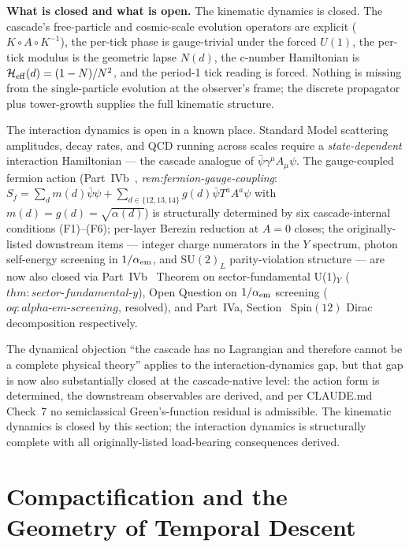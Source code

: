 \documentclass[12pt,a4paper]{article}
\begin{document}
\medskip\noindent\textbf{What is closed and what is open.}
The kinematic dynamics is closed. The cascade's free-particle and
cosmic-scale evolution operators are explicit
($K \circ A \circ K^{-1}$), the per-tick phase is gauge-trivial under
the forced $U(1)$, the per-tick modulus is the geometric lapse
$N(d)$, the c-number Hamiltonian is $\mathcal{H}_{\rm eff}(d) = (1-N)/N^2$,
and the period-1 tick reading is forced. Nothing is missing from the
single-particle evolution at the observer's frame; the discrete
propagator plus tower-growth supplies the full kinematic structure.

The interaction dynamics is open in a known place. Standard Model
scattering amplitudes, decay rates, and QCD running across scales
require a \emph{state-dependent} interaction Hamiltonian --- the
cascade analogue of $\bar\psi\gamma^\mu A_\mu\psi$. The
gauge-coupled fermion action
(Part~IVb~\cite{part4b}, \emph{rem:fermion-gauge-coupling}:
$S_f = \sum_d m(d)\bar\psi\psi + \sum_{d\in\{12,13,14\}} g(d)\bar\psi
T^a A^a\psi$ with $m(d) = g(d) = \sqrt{\alpha(d)}$) is structurally
determined by six cascade-internal conditions (F1)--(F6); per-layer
Berezin reduction at $A = 0$ closes; the originally-listed downstream
items --- integer charge numerators in the $Y$ spectrum, photon
self-energy screening in $1/\alpha_{\rm em}$, and $\mathrm{SU}(2)_L$
parity-violation structure --- are now also closed via
Part~IVb~\cite{part4b} Theorem on sector-fundamental U(1)$_Y$
($\mathit{thm{:}sector\text{-}fundamental\text{-}y}$),
Open Question on $1/\alpha_{\rm em}$ screening
($\mathit{oq{:}alpha\text{-}em\text{-}screening}$, resolved), and
Part~IVa, Section~ Spin$(12)$ Dirac decomposition
respectively.

The dynamical objection ``the cascade has no Lagrangian and therefore
cannot be a complete physical theory'' applies to the
interaction-dynamics gap, but that gap is now also substantially
closed at the cascade-native level: the action form is determined,
the downstream observables are derived, and per CLAUDE.md Check~7
no semiclassical Green's-function residual is admissible. The
kinematic dynamics is closed by this section; the interaction
dynamics is structurally complete with all originally-listed
load-bearing consequences derived.

\section{Compactification and the Geometry of Temporal Descent}
\label{sec:compactification}
\end{document}
